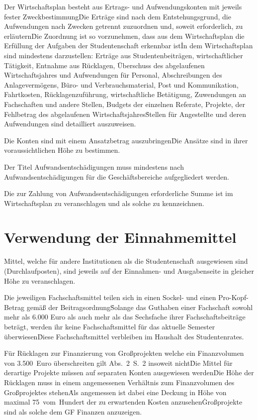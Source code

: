 \Abs \Satz Der Wirtschaftsplan besteht aus Ertrags- und Aufwendungskonten mit jeweils fester Zweckbestimmung\. Die Erträge sind nach dem Entstehungsgrund, die Aufwendungen nach Zwecken getrennt zuzuordnen und, soweit erforderlich, zu erläutern\. Die Zuordnung ist so vorzunehmen, dass aus dem Wirtschaftsplan die Erfüllung der Aufgaben der Studentenschaft erkennbar ist\. In dem Wirtschaftsplan sind mindestens darzustellen: Erträge aus Studentenbeiträgen, wirtschaftlicher Tätigkeit, Entnahme aus Rücklagen, Überschuss des abgelaufenen Wirtschaftsjahres und Aufwendungen für Personal, Abschreibungen des Anlagevermögens, Büro- und Verbrauchsmaterial, Post und Kommunikation, Fahrtkosten, Rücklagenzuführung, wirtschaftliche Betätigung, Zuwendungen an Fachschaften und andere Stellen, Budgets der einzelnen Referate, Projekte, der Fehlbetrag des abgelaufenen Wirtschaftsjahres\. Stellen für Angestellte und deren Aufwendungen sind detailliert auszuweisen.

\Abs \Satz Die Konten sind mit einem Ansatzbetrag auszubringen\. Die Ansätze sind in ihrer voraussichtlichen Höhe zu bestimmen.

\Abs \Satz Der Titel Aufwandsentschädigungen muss mindestens nach Aufwandsentschädigungen für die Geschäftsbereiche aufgegliedert werden.

\Abs \Satz Die zur Zahlung von Aufwandsentschädigungen erforderliche Summe ist im Wirtschaftsplan zu veranschlagen und als solche zu kennzeichnen.



\section{Verwendung der Einnahmemittel}

\Abs \Satz Mittel, welche für andere Institutionen als die Studentenschaft ausgewiesen sind (Durchlaufposten), sind jeweils auf der Einnahmen- und Ausgabenseite in gleicher Höhe zu veranschlagen.

\Abs \Satz Die jeweiligen Fachschaftsmittel teilen sich in einen Sockel- und einen Pro-Kopf-Betrag gemäß der Beitragsordnung\. Solange das Guthaben einer Fachschaft sowohl mehr als 6.000 Euro als auch mehr als das Sechsfache ihrer Fachschaftsbeiträge beträgt, werden ihr keine Fachschaftsmittel für das aktuelle Semester überwiesen\. Diese Fachschaftsmittel verbleiben im Haushalt des Studentenrates.

\Abs \Satz Für Rücklagen zur Finanzierung von Großprojekten welche ein Finanzvolumen von 3.500~Euro überschreiten gilt Abs.~2~S.~2 insoweit nicht\. Die Mittel für derartige Projekte müssen auf separaten Konten ausgewiesen werden\. Die Höhe der Rücklagen muss in einem angemessenen Verhältnis zum Finanzvolumen des Großprojektes stehen\. Als angemessen ist dabei eine Deckung in Höhe von maximal 75~vom~Hundert der zu erwartenden Kosten anzusehen\. Großprojekte sind als solche dem GF Finanzen anzuzeigen.

